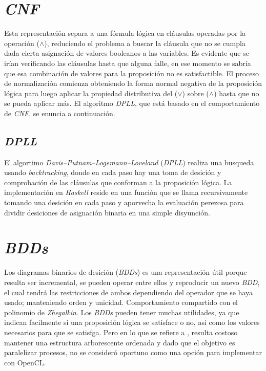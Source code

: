 \section{\textit{CNF}}

Esta representación separa a una fórmula lógica en cláusulas operadas por la operación ($\land$), reduciendo el problema \sat a buscar la cláusula que no se cumpla dada cierta asignación de valores booleanos a las variables. Es evidente que se irían verificando las cláusulas hasta que alguna falle, en ese momento se sabría que esa combinación de valores para la proposición no es satisfactible. El proceso de normalización comienza obteniendo la forma normal negativa de la proposición lógica para luego aplicar la propiedad distributiva del ($\lor$) sobre ($\land$) hasta que no se pueda aplicar más. El algoritmo \textit{DPLL}, que está basado en el comportamiento de \textit{CNF}, se enuncia a continuación.

\subsection{\textit{DPLL}}

El algortimo \textit{Davis–Putnam–Logemann–Loveland} (\textit{DPLL}) realiza una busqueda usando \textit{backtracking}, donde en cada paso hay una toma de desición y comprobación de las cláusulas que conforman a la proposición lógica. La implementación en \textit{Haskell} reside en una función que se llama recursivamente tomando una desición en cada paso y aporvecha la evaluación perezosa para dividir desiciones de asignación binaria en una simple disyunción.

\section{\textit{BDDs}}

Los diagramas binarios de desición (\textit{BDDs}) es una representación útil porque resulta ser incremental, se pueden operar entre ellos y reproducir un nuevo \textit{BDD}, el cual tendrá las restricciones de ambos dependiendo del operador que se haya usado; manteniendo orden y unicidad. Comportamiento compartido con el polinomio de \textit{Zhegalkin}. Los \textit{BDDs} pueden tener muchas utilidades, ya que indican facilmente si una proposición lógica se satisface o no, asi como los valores necesarios para que se satisfga. Pero en lo que se refiere a \sat, resulta costoso mantener una estructura arborescente ordenada y dado que el objetivo es paralelizar procesos, no se consideró oportuno como una opción para implementar con OpenCL.
